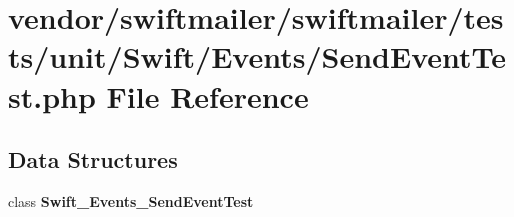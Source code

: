 \section{vendor/swiftmailer/swiftmailer/tests/unit/\+Swift/\+Events/\+Send\+Event\+Test.php File Reference}
\label{_send_event_test_8php}
\subsection*{Data Structures}
\begin{DoxyCompactItemize}
\item 
class {\bf Swift\+\_\+\+Events\+\_\+\+Send\+Event\+Test}
\end{DoxyCompactItemize}
